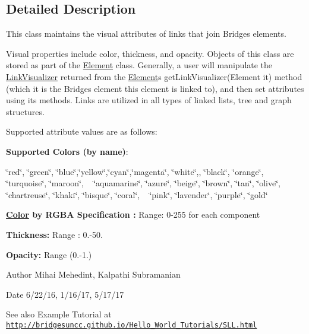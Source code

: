 \subsection{Detailed Description}
This class maintains the visual attributes of links that join Bridges elements. 

Visual properties include color, thickness, and opacity. Objects of this class are stored as part of the \hyperlink{classbridges_1_1base_1_1_element}{Element} class. Generally, a user will manipulate the \hyperlink{classbridges_1_1base_1_1_link_visualizer}{Link\+Visualizer} returned from the \hyperlink{classbridges_1_1base_1_1_element}{Element}\textquotesingle{}s get\+Link\+Visualizer(\+Element it) method (which it is the Bridges element this element is linked to), and then set attributes using its methods. Links are utilized in all types of linked lists, tree and graph structures.

Supported attribute values are as follows\+:

{\bfseries Supported Colors (by name)}\+: 

\char`\"{}red\char`\"{}, \char`\"{}green\char`\"{}, \char`\"{}blue\char`\"{},\char`\"{}yellow\char`\"{},\char`\"{}cyan\char`\"{},\char`\"{}magenta\char`\"{}, \char`\"{}white\char`\"{},, \char`\"{}black\char`\"{}, \char`\"{}orange\char`\"{}, \char`\"{}turquoise\char`\"{}, \char`\"{}maroon\char`\"{}, ~\newline
 \char`\"{}aquamarine\char`\"{}, \char`\"{}azure\char`\"{}, \char`\"{}beige\char`\"{}, \char`\"{}brown\char`\"{}, \char`\"{}tan\char`\"{}, \char`\"{}olive\char`\"{}, \char`\"{}chartreuse\char`\"{}, \char`\"{}khaki\char`\"{}, \char`\"{}bisque\char`\"{}, \char`\"{}coral\char`\"{}, ~\newline
 \char`\"{}pink\char`\"{}, \char`\"{}lavender\char`\"{}, \char`\"{}purple\char`\"{}, \char`\"{}gold\char`\"{} 

{\bfseries  \hyperlink{classbridges_1_1base_1_1_color}{Color} by R\+G\+B\+A Specification \+:} Range\+: 0-\/255 for each component 

{\bfseries  Thickness\+: } Range \+: 0.-\/50.

{\bfseries  Opacity\+: } Range (0.-\/1.) 

\begin{DoxyAuthor}{Author}
Mihai Mehedint, Kalpathi Subramanian
\end{DoxyAuthor}
\begin{DoxyDate}{Date}
6/22/16, 1/16/17, 5/17/17
\end{DoxyDate}
\begin{DoxySeeAlso}{See also}
Example Tutorial at ~\newline
 \href{http://bridgesuncc.github.io/Hello_World_Tutorials/SLL.html}{\tt http\+://bridgesuncc.\+github.\+io/\+Hello\+\_\+\+World\+\_\+\+Tutorials/\+S\+L\+L.\+html} 
\end{DoxySeeAlso}


